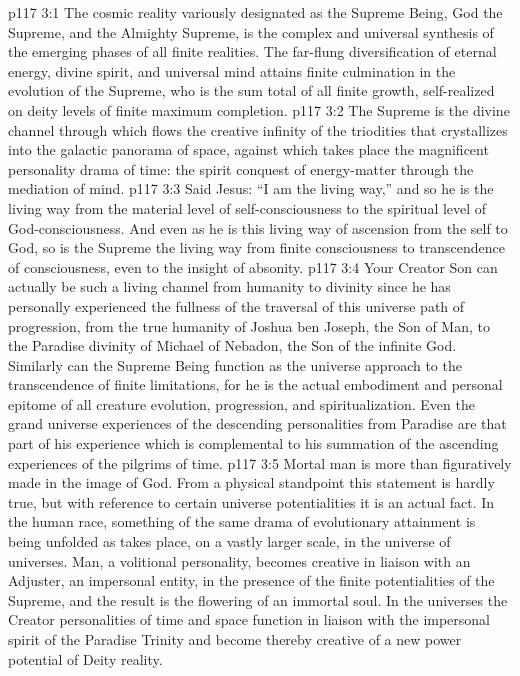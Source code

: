 \vs p117 3:1 The cosmic reality variously designated as the Supreme Being, God the Supreme, and the Almighty Supreme, is the complex and universal synthesis of the emerging phases of all finite realities. The far\hyp{}flung diversification of eternal energy, divine spirit, and universal mind attains finite culmination in the evolution of the Supreme, who is the sum total of all finite growth, self\hyp{}realized on deity levels of finite maximum completion.
\vs p117 3:2 The Supreme is the divine channel through which flows the creative infinity of the triodities that crystallizes into the galactic panorama of space, against which takes place the magnificent personality drama of time: the spirit conquest of energy\hyp{}matter through the mediation of mind.
\pc \vs p117 3:3 Said Jesus: \textcolor{ubdarkred}{“I am the living way,”} and so he is the living way from the material level of self\hyp{}consciousness to the spiritual level of God\hyp{}consciousness. And even as he is this living way of ascension from the self to God, so is the Supreme the living way from finite consciousness to transcendence of consciousness, even to the insight of absonity.
\vs p117 3:4 Your Creator Son can actually be such a living channel from humanity to divinity since he has personally experienced the fullness of the traversal of this universe path of progression, from the true humanity of Joshua ben Joseph, the Son of Man, to the Paradise divinity of Michael of Nebadon, the Son of the infinite God. Similarly can the Supreme Being function as the universe approach to the transcendence of finite limitations, for he is the actual embodiment and personal epitome of all creature evolution, progression, and spiritualization. Even the grand universe experiences of the descending personalities from Paradise are that part of his experience which is complemental to his summation of the ascending experiences of the pilgrims of time.
\pc \vs p117 3:5 Mortal man is more than figuratively made in the image of God. From a physical standpoint this statement is hardly true, but with reference to certain universe potentialities it is an actual fact. In the human race, something of the same drama of evolutionary attainment is being unfolded as takes place, on a vastly larger scale, in the universe of universes. Man, a volitional personality, becomes creative in liaison with an Adjuster, an impersonal entity, in the presence of the finite potentialities of the Supreme, and the result is the flowering of an immortal soul. In the universes the Creator personalities of time and space function in liaison with the impersonal spirit of the Paradise Trinity and become thereby creative of a new power potential of Deity reality.
